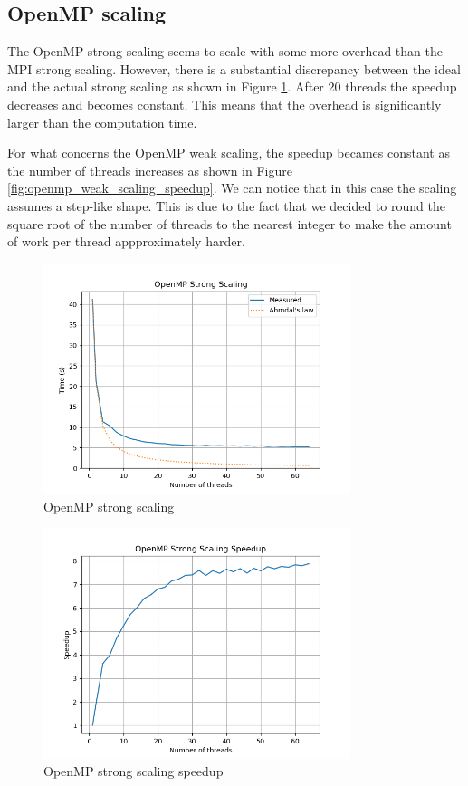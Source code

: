 \subsection{OpenMP scaling}

The OpenMP strong scaling seems to scale with some more overhead than the MPI strong scaling. However, there is a substantial discrepancy between the ideal and the actual strong scaling as shown in Figure \ref{fig:openmp_strong_scaling}. After 20 threads the speedup decreases and becomes constant. This means that the overhead is significantly larger than the computation time.

For what concerns the OpenMP weak scaling, the speedup becames constant as the number of threads increases as shown in Figure \ref{fig:openmp_weak_scaling_speedup}. We can notice that in this case the scaling assumes a step-like shape. This is due to the fact that we decided to round the square root of the number of threads to the nearest integer to make the amount of work per thread appproximately harder.

\begin{figure}[h!]
    \centering
    \includegraphics[width=0.8\textwidth]{../images/omp_strong_scaling.png}
    \caption{OpenMP strong scaling}
    \label{fig:openmp_strong_scaling}
\end{figure}

\begin{figure}[h!]
    \centering
    \includegraphics[width=0.8\textwidth]{../images/omp_strong_scaling_speedup.png}
    \caption{OpenMP strong scaling speedup}
    \label{fig:openmp_strong_scaling_speedup}
\end{figure}


